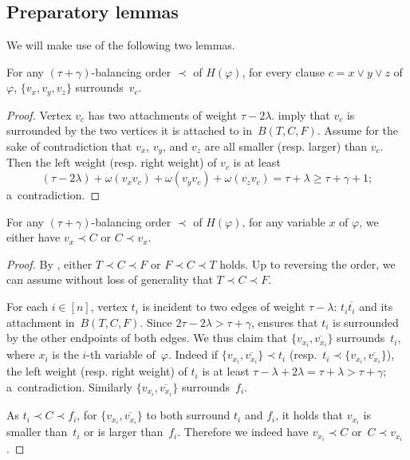 \documentclass[a4paper,UKenglish,cleveref,hyperref,autoref]{lipics-v2021}
\newcommand{\weight}{\omega}
\begin{document}
\subsection{Preparatory lemmas}

We will make use of the following two lemmas.

\begin{lemma}\label{lem:clause-surrounding}
For any $(\tau + \gamma)$-balancing order $\prec$ of $H(\varphi)$, for every clause $c = x \lor y \lor z$ of~$\varphi$, $\{v_x, v_y, v_z\}$ surrounds~$v_c$.
\end{lemma}
\begin{proof}
Vertex $v_c$ has two attachments of weight $\tau - 2\lambda$.
 imply that $v_c$ is surrounded by the two vertices it is attached to in~$B(T,C,F)$.
Assume for the sake of contradiction that $v_x$, $v_y$, and $v_z$ are all smaller (resp. larger) than $v_c$.
Then the left weight (resp. right weight) of $v_c$ is at least
$$
(\tau - 2\lambda) + \weight(v_xv_c) + \weight(v_yv_c)+ \weight(v_zv_c)
= \tau + \lambda \geqslant \tau + \gamma + 1;
$$
a~contradiction. 
\end{proof}

\begin{lemma}\label{lem:well-defined-order}
For any $(\tau+\gamma)$-balancing order $\prec$ of $H(\varphi)$, for any variable $x$ of $\varphi$, we either have $v_x \prec C$ or $C \prec v_x$. 
\end{lemma}
\begin{proof}
By , either $T \prec C \prec F$ or $F \prec C \prec T$ holds.
Up to reversing the order, we can assume without loss of generality that $T \prec C \prec F$.

For each $i \in [n]$, vertex $t_i$ is incident to two edges of weight $\tau - \lambda$: $t_i \overline{t_i}$ and its attachment in~$B(T,C,F)$.
Since $2\tau - 2 \lambda > \tau + \gamma$,  ensures that $t_i$ is surrounded by the other endpoints of both edges.
We thus claim that $\{v_{x_i}, \overline{v_{x_i}}\}$ surrounds~$t_i$, where $x_i$ is the $i$-th variable of~$\varphi$.
Indeed if $\{v_{x_i}, \overline{v_{x_i}}\} \prec t_i$ (resp.~$t_i \prec \{v_{x_i}, \overline{v_{x_i}}\}$), the left weight (resp. right weight) of $t_i$ is at least $\tau - \lambda + 2 \lambda = \tau + \lambda > \tau + \gamma$; a~contradiction.
Similarly $\{v_{x_i}, \overline{v_{x_i}}\}$ surrounds~$f_i$.

As $t_i \prec C \prec f_i$, for $\{v_{x_i}, \overline{v_{x_i}}\}$ to both surround $t_i$ and $f_i$, it holds that $v_{x_i}$ is smaller than~$t_i$ or is larger than~$f_i$.
Therefore we indeed have $v_{x_i} \prec C$ or~$C \prec v_{x_i}$.
\end{proof}
\end{document}
